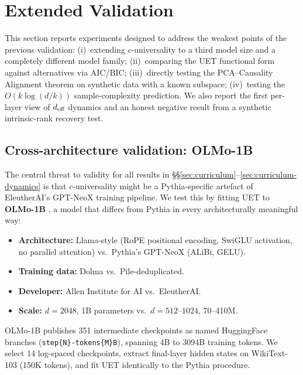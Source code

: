 \section{Extended Validation}
\label{sec:extended}

This section reports experiments designed to address the weakest points of the
previous validation: (i)~extending $c$-universality to a third model size and a
completely different model family; (ii)~comparing the UET functional form against
alternatives via AIC/BIC; (iii)~directly testing the PCA--Causality Alignment
theorem on synthetic data with a known subspace; (iv)~testing the
$O(k\log(d/k))$ sample-complexity prediction.
We also report the first per-layer view of $d_{\mathrm{eff}}$ dynamics
and an honest negative result from a synthetic intrinsic-rank recovery test.

\subsection{Cross-architecture validation: OLMo-1B}
\label{sec:olmo}

The central threat to validity for all results in \S\S\ref{sec:curriculum}--\ref{sec:curriculum-dynamics}
is that $c$-universality might be a Pythia-specific artefact of EleutherAI's
GPT-NeoX training pipeline.
We test this by fitting UET to \textbf{OLMo-1B} \citep{olmo2024}, a model that
differs from Pythia in every architecturally meaningful way:

\begin{itemize}[leftmargin=1.5em,itemsep=0pt]
\item \textbf{Architecture:} Llama-style (RoPE positional encoding, SwiGLU activation,
      no parallel attention) vs.\ Pythia's GPT-NeoX (ALiBi, GELU).
\item \textbf{Training data:} Dolma \citep{dolma2024} vs.\ Pile-deduplicated.
\item \textbf{Developer:} Allen Institute for AI vs.\ EleutherAI.
\item \textbf{Scale:} $d=2048$, 1B parameters vs.\ $d=512\text{--}1024$, 70--410M.
\end{itemize}

OLMo-1B publishes 351 intermediate checkpoints as named HuggingFace branches
(\texttt{step\{N\}-tokens\{M\}B}), spanning 4B to 3094B training tokens.
We select 14 log-spaced checkpoints, extract final-layer hidden states on
WikiText-103 (150K tokens), and fit UET identically to the Pythia procedure.

